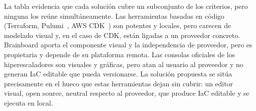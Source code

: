 \documentclass{article}
\begin{document}
{        \justify
        La tabla evidencia que cada solución cubre un subconjunto de los criterios, pero
        ninguna los reúne simultáneamente. Las herramientas basadas en código (Terraform,
        Pulumi~\cite{noauthor_infrastructure_nodate}, AWS CDK~\cite{noauthor_cloud_nodate})
        son potentes y locales, pero carecen de modelado visual y, en el caso
        de CDK, están ligadas a un proveedor concreto. Brainboard aporta el componente
        visual y la independencia de proveedor, pero es propietaria y depende de su
        plataforma remota. Las consolas oficiales de los hiperescaladores son visuales y
        gráficas, pero atan al usuario al proveedor y no generan IaC editable que pueda
        versionarse. La solución propuesta se sitúa precisamente en el hueco que estas
        herramientas dejan sin cubrir: un editor visual, open source, neutral respecto al
        proveedor, que produce IaC editable y se ejecuta en local.
        \par
    }


    \newpage
\end{document}
